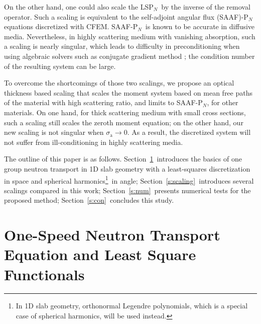 \documentclass[review]{elsarticle}
\newcommand{\pn}{P$_N$}
\begin{document}
On the other hand, one could also scale the LS\pn\ by the  inverse of the removal operator. Such a scaling is equivalent to the self-adjoint angular flux (SAAF)-\pn\, equations discretized with CFEM. SAAF-\pn\, is known to be accurate in diffusive media. Nevertheless, in highly scattering medium with vanishing absorption, such a scaling is nearly singular, which leads to difficulty in preconditioning {when using algebraic solvers such as conjugate gradient method \cite{conjugate-gradient}}; the condition number of the resulting system can be large\cite{morel_saaf,clifmc}.

To overcome the shortcomings of those two scalings, we propose an optical thickness based scaling that scales the moment system based on mean free paths of the material with high scattering ratio, and limits to  SAAF-\pn, for other materials. On one hand, for thick scattering medium with small cross sections, such a scaling still scales the zeroth moment equation; on the other hand, our new scaling is not singular when $\sigma_\mathrm{a} \rightarrow 0$. As a result, the discretized system will not suffer from ill-conditioning in highly scattering media.

The outline of this paper is as follows. Section\ \ref{s:basics}\ introduces the basics of one group neutron transport in 1D slab geometry with a least-squares discretization in space and spherical harmonics\footnote{In 1D slab geometry, orthonormal Legendre polynomials, which is a special case of spherical harmonics, will be used instead.}\ in angle; Section\ \ref{s:scaling}\ introduces several scalings compared in this work; Section\ \ref{s:num}\ presents numerical tests for the proposed method; Section\ \ref{s:con}\ concludes this study.

%
\section{One-Speed Neutron Transport Equation and Least Square Functionals}
\label{s:basics}
\end{document}
